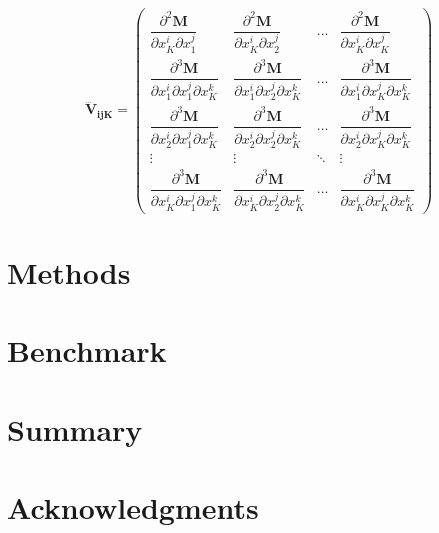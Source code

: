 \documentclass[aps,prb,twocolumn,superscriptaddress,floatfix,longbibliography,10pt]{revtex4-2}
\begin{document}
\begin{equation} 
\mathbf{\dddot V_{ijK}} = 
\begin{pmatrix}
\dfrac{\partial^2\mathbf{M}}{\partial x_K^i\partial x_1^j}  & \dfrac{\partial^2\mathbf{M}}{\partial x_K^i\partial x_2^j} & \dots  & \dfrac{\partial^2\mathbf{M}}{\partial x_K^i\partial x_K^j} \\
\dfrac{\partial^3\mathbf{M}}{\partial x_1^i\partial x_1^j\partial x_K^k}  & \dfrac{\partial^3\mathbf{M}}{\partial x_1^i\partial x_2^j\partial x_K^k} & \dots  & \dfrac{\partial^3\mathbf{M}}{\partial x_1^i\partial x_K^j\partial x_K^k} \\
\dfrac{\partial^3\mathbf{M}}{\partial x_2^i\partial x_1^j\partial x_K^k}  & \dfrac{\partial^3\mathbf{M}}{\partial x_2^i\partial x_2^j\partial x_K^k} & \dots  & \dfrac{\partial^3\mathbf{M}}{\partial x_2^i\partial x_K^j\partial x_K^k} \\
\vdots & \vdots & \ddots & \vdots \\
\dfrac{\partial^3\mathbf{M}}{\partial x_K^i\partial x_1^j\partial x_K^k}  & \dfrac{\partial^3\mathbf{M}}{\partial x_K^i\partial x_2^j\partial x_K^k} & \dots  & \dfrac{\partial^3\mathbf{M}}{\partial x_K^i\partial x_K^j\partial x_K^k} \nonumber
\end{pmatrix}
\end{equation}

\vspace{10mm}

\section{\label{sec:Methods}Methods}



\section{\label{sec:Benchmark}Benchmark}

\vspace{10mm}

\section{\label{sec:Summary}Summary}

\vspace{50mm}

\section{\label{sec:Acknowledgments}Acknowledgments}
\end{document}
